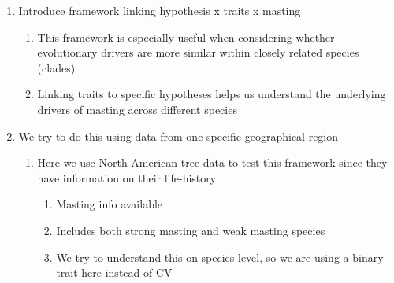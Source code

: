 \documentclass{article}
\begin{document}
\begin{enumerate}
\item Introduce framework linking hypothesis x traits x masting
\begin{enumerate}
\item This framework is especially useful when considering whether evolutionary drivers are more similar within closely related species (clades)
\item Linking traits to specific hypotheses helps us understand the underlying drivers of masting across different species
\end{enumerate}
\item We try to do this using data from one specific geographical region
\begin{enumerate}
\item Here we use North American tree data to test this framework since they have information on their life-history
\begin{enumerate}
\item Masting info available
\item Includes both strong masting and weak masting species
\item We try to understand this on species level, so we are using a binary trait here instead of CV
\end{enumerate}
\end{enumerate}
\end{enumerate}
\end{document}
